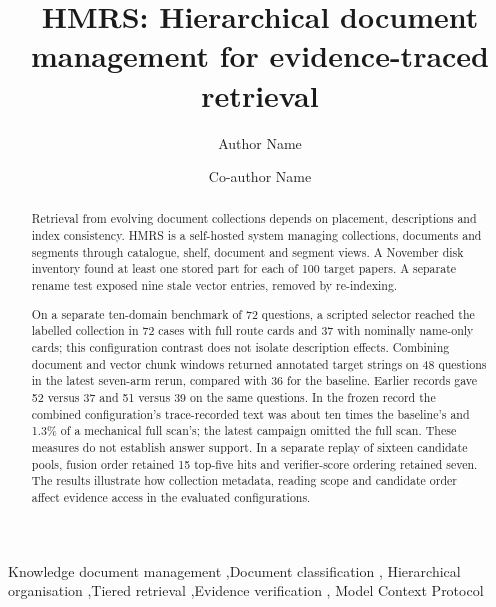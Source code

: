 \documentclass[review,12pt]{elsarticle}
\begin{document}
\begin{frontmatter}

\title{HMRS: Hierarchical document management for evidence-traced retrieval}

\author[inst1]{Author Name}
\author[inst1]{Co-author Name}

\begin{abstract}
Retrieval from evolving document collections depends on placement,
descriptions and index consistency. HMRS is a self-hosted system managing
collections, documents and segments through catalogue, shelf, document and
segment views. A November disk inventory found at least one stored part for
each of 100 target papers. A separate rename test exposed nine stale vector
entries, removed by re-indexing.

On a separate ten-domain benchmark of 72 questions, a scripted selector reached
the labelled collection in 72 cases with full route cards and 37 with nominally
name-only cards; this configuration contrast does not isolate description effects.
Combining document and vector chunk windows returned annotated target strings
on 48 questions in the latest seven-arm rerun, compared with 36 for the
baseline. Earlier records gave 52 versus 37 and 51 versus 39 on the same
questions. In the frozen record the combined configuration's trace-recorded
text was about ten times the baseline's and 1.3\% of a mechanical full scan's;
the latest campaign omitted the full scan. These measures do not establish
answer support. In a separate replay of sixteen candidate pools, fusion order
retained 15 top-five hits and verifier-score ordering retained seven. The
results illustrate how collection metadata, reading scope and candidate order
affect evidence access in the evaluated configurations.
\end{abstract}

\begin{keyword}
Knowledge document management \sep Document classification \sep
Hierarchical organisation \sep Tiered retrieval \sep Evidence verification \sep
Model Context Protocol
\end{keyword}

\end{frontmatter}
















{\ifdefined\HMRSReviewLayout\else\footnotesize\fi
\setlength{\bibsep}{0.5pt plus 0.2ex}


}
\end{document}
